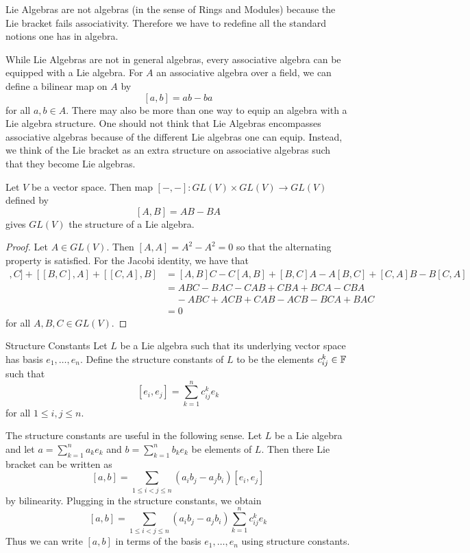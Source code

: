 \documentclass[a4paper]{article}
\begin{document}
Lie Algebras are not algebras (in the sense of Rings and Modules) because the Lie bracket fails associativity. Therefore we have to redefine all the standard notions one has in algebra. 

While Lie Algebras are not in general algebras, every associative algebra can be equipped with a Lie algebra. For $A$ an associative algebra over a field, we can define a bilinear map on $A$ by $$[a,b]=ab-ba$$ for all $a,b\in A$. There may also be more than one way to equip an algebra with a Lie algebra structure. One should not think that Lie Algebras encompasses associative algebras because of the different Lie algebras one can equip. Instead, we think of the Lie bracket as an extra structure on associative algebras such that they become Lie algebras. 

\begin{eg}{}{} Let $V$ be a vector space. Then map $[-,-]:GL(V)\times GL(V)\to GL(V)$ defined by $$[A,B]=AB-BA$$ gives $GL(V)$ the structure of a Lie algebra. \tcbline
\begin{proof}
Let $A\in GL(V)$. Then $[A,A]=A^2-A^2=0$ so that the alternating property is satisfied. For the Jacobi identity, we have that 
\begin{align*}
[[A,B],C]+[[B,C],A]+[[C,A],B]&=[A,B]C-C[A,B]+[B,C]A-A[B,C]+[C,A]B-B[C,A]\\
&=ABC-BAC-CAB+CBA+BCA-CBA\\
&\;\;\;\;-ABC+ACB+CAB-ACB-BCA+BAC\\
&=0
\end{align*}
for all $A,B,C\in GL(V)$. 
\end{proof}
\end{eg}

\begin{defn}{Structure Constants}{} Let $L$ be a Lie algebra such that its underlying vector space has basis $e_1,\dots,e_n$. Define the structure constants of $L$ to be the elements $c_{ij}^k\in\mathbb{F}$ such that $$[e_i,e_j]=\sum_{k=1}^nc_{ij}^ke_k$$ for all $1\leq i,j\leq n$. 
\end{defn}

The structure constants are useful in the following sense. Let $L$ be a Lie algebra and let $a=\sum_{k=1}^na_ke_k$ and $b=\sum_{k=1}^nb_ke_k$ be elements of $L$. Then there Lie bracket can be written as $$[a,b]=\sum_{1\leq i<j\leq n}(a_ib_j-a_jb_i)[e_i,e_j]$$ by bilinearity. Plugging in the structure constants, we obtain $$[a,b]=\sum_{1\leq i<j\leq n}(a_ib_j-a_jb_i)\sum_{k=1}^nc_{ij}^ke_k$$ Thus we can write $[a,b]$ in terms of the basis $e_1,\dots,e_n$ using structure constants. 
\end{document}
